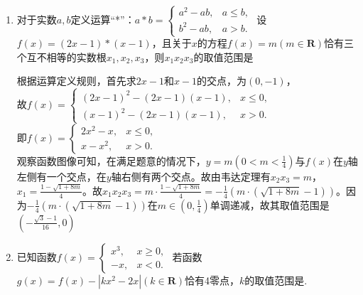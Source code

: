 \begin{enumerate}
\begin{enumerate}
\begin{jieda}
        \end{jieda}
    \item 对于实数$a, b$定义运算“*”：$a*b = \left\{  
         \begin{array}{ll}  
            a^2 - ab, & a \leq b, \\  
            b^2 - ab, & a > b.
         \end{array}
    \right.$ 设$f(x) = (2x-1) * (x-1)$，且关于$x$的方程$f(x) = m (m \in \mathbf{R})$恰有三个互不相等的实数根$x_1, x_2, x_3$，则$x_1x_2x_3$的取值范围是
    \begin{jieda}
        根据运算定义规则，首先求$2x-1$和$x-1$的交点，为$(0, -1)$，\\
        故$f(x) = \left\{ 
                 \begin{array}{ll}  
                    (2x-1)^2 - (2x-1)(x-1), & x \leq 0, \\  
                    (x-1)^2 - (2x-1)(x-1), & x > 0.
                 \end{array}
                \right. $ \\
        即$f(x) = \left\{ 
                 \begin{array}{ll}  
                    2x^2-x, & x \leq 0, \\  
                    x-x^2, & x > 0.
                 \end{array}
                \right. $ \\
        观察函数图像可知，在满足题意的情况下，$y = m (0 < m < \frac{1}{4})$与$f(x)$在$y$轴左侧有一个交点，在$y$轴右侧有两个交点。故由韦达定理有$x_2x_3 = m$，$x_1 = \frac{1-\sqrt{1+8m}}{4}$。故$x_1x_2x_3 = m \cdot \frac{1-\sqrt{1+8m}}{4} = -\frac{1}{4}(m \cdot (\sqrt{1+8m} - 1))$。因为$-\frac{1}{4}(m \cdot (\sqrt{1+8m} - 1))$在$m \in (0, \frac{1}{4})$单调递减，故其取值范围是$(-\frac{\sqrt{3} - 1}{16}, 0)$
    \end{jieda}
    \item 已知函数$f(x) = \left\{  
         \begin{array}{ll}  
            x^3, & x \geq 0, \\  
            -x, & x < 0.
         \end{array}
    \right.$ 若函数$g(x) = f(x) - |kx^2-2x| (k \in \mathbf{R})$恰有4零点，$k$的取值范围是.
\end{enumerate}
\end{enumerate}
